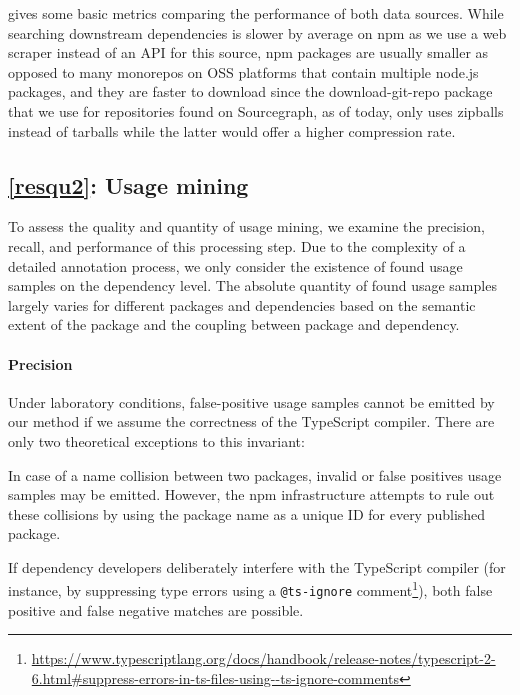  gives some basic metrics comparing the performance of both data sources.
While searching downstream dependencies is slower by average on npm as we use a web scraper instead of an API for this source, npm packages are usually smaller as opposed to many monorepos on OSS platforms that contain multiple node.js packages, and they are faster to download since the download-git-repo package that we use for repositories found on Sourcegraph, as of today, only uses zipballs instead of tarballs while the latter would offer a higher compression rate.

\subsection{\ref{resqu2}: Usage mining}
\label{sec:evaluation/resqu2}

To assess the quality and quantity of usage mining, we examine the precision, recall, and performance of this processing step.
Due to the complexity of a detailed annotation process, we only consider the existence of found usage samples on the dependency level.
The absolute quantity of found usage samples largely varies for different packages and dependencies based on the semantic extent of the package and the coupling between package and dependency.

\paragraph{Precision}
\label{sec:evaluation/resqu2/precision}

Under laboratory conditions, false-positive usage samples cannot be emitted by our method if we assume the correctness of the TypeScript compiler.
There are only two theoretical exceptions to this invariant:
\begin{enumerate*}[label=(\roman*)]
	\item In case of a name collision between two packages, invalid or false positives usage samples may be emitted.
		However, the npm infrastructure attempts to rule out these collisions by using the package name as a unique ID for every published package.
	\item If dependency developers deliberately interfere with the TypeScript compiler (for instance, by suppressing type errors using a \verb|@ts-ignore| comment\footnote{\url{https://www.typescriptlang.org/docs/handbook/release-notes/typescript-2-6.html\#suppress-errors-in-ts-files-using--ts-ignore-comments}}), both false positive and false negative matches are possible.
\end{enumerate*}

